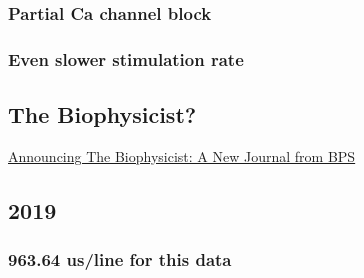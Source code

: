 \documentclass[11pt]{article}
\begin{document}
\subsubsection{Partial Ca channel block}
\label{sec:org0fab6cb}
\subsubsection{Even slower stimulation rate}
\label{sec:org74c5a2a}
\subsection{The Biophysicist?}
\label{sec:org7255fce}
\href{//\%3cLYRIS-20262805-43074-2019.04.16-15.41.20--tom\_shannon\#rush.edu@lists.biophysics.org\%3E}{Announcing The Biophysicist: A New Journal from BPS}
\subsection{2019}
\label{sec:org6b2905d}
\subsubsection{963.64 us/line for this data}
\label{sec:orgec23fb9}
\end{document}
